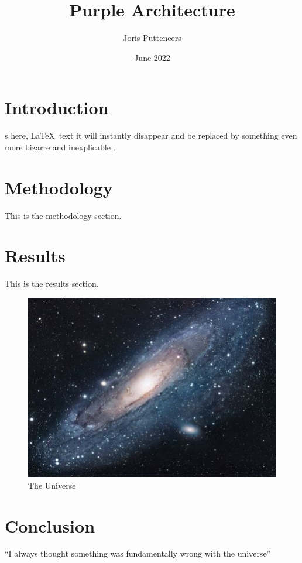 \documentclass{article}
\title{Purple Architecture}
\author{Joris Putteneers}
\date{June 2022}
\begin{document}
\color{black}
\pagecolor{white} 

\maketitle

\section{Introduction}
s here, {\color{blue}\LaTeX\ text} it will instantly disappear and be replaced by something even more bizarre and inexplicable \cite{databaseII}.

 

\section{Methodology}
This is the methodology section.

\section{Results}
This is the results section.

\begin{figure}[h!]
\includegraphics[scale=2]{./images/universe}
\caption{The Universe}
\label{fig:pic}
\end{figure}

\section{Conclusion}
``I always thought something was fundamentally wrong with the universe'' \citep{adams1995hitchhiker}



\end{document}

